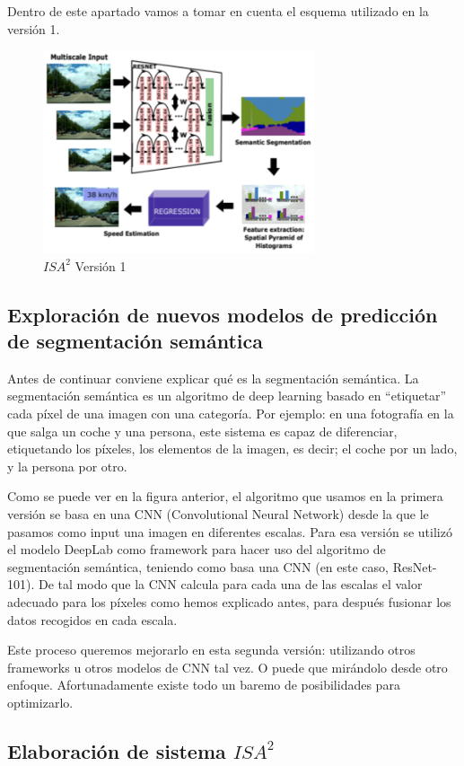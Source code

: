 \documentclass[12pt,oneside,a4paper]{article}
\begin{document}
Dentro de este apartado vamos a tomar en cuenta el esquema utilizado en la versión 1.

\begin{figure}[h]
  \centering
  \includegraphics[width=8cm]{figuras/Figura_Esquema_ISA2_Version_1_SegSem.eps}
  \caption{$ISA^2$ Versión 1}
\end{figure}

\subsection{Exploración de nuevos modelos de predicción de segmentación semántica}

Antes de continuar conviene explicar qué es la segmentación semántica. La segmentación semántica es un algoritmo de deep learning basado en ``etiquetar'' cada píxel de una imagen con una categoría. Por ejemplo: en una fotografía en la que salga un coche y una persona, este sistema es capaz de diferenciar, etiquetando los píxeles, los elementos de la imagen, es decir; el coche por un lado, y la persona por otro.

Como se puede ver en la figura anterior, el algoritmo que usamos en la primera versión se basa en una CNN (Convolutional Neural Network) desde la que le pasamos como input una imagen en diferentes escalas. Para esa versión se utilizó el modelo DeepLab como framework para hacer uso del algoritmo de segmentación semántica, teniendo como basa una CNN (en este caso, ResNet-101). De tal modo que la CNN calcula para cada una de las escalas el valor adecuado para los píxeles como hemos explicado antes, para después fusionar los datos recogidos en cada escala.

Este proceso queremos mejorarlo en esta segunda versión: utilizando otros frameworks u otros modelos de CNN tal vez. O puede que mirándolo desde otro enfoque. Afortunadamente existe todo un baremo de posibilidades para optimizarlo. 
\subsection{Elaboración de sistema $ISA^2$}
\end{document}
